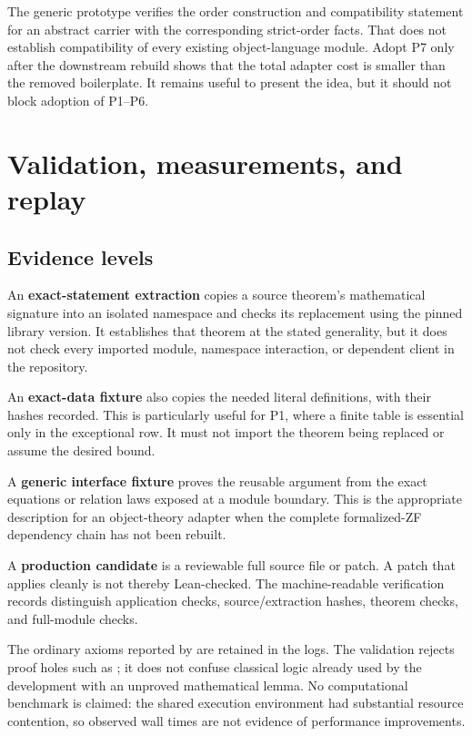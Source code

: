 \documentclass[11pt,letterpaper]{article}
\newcommand{\code}[1]{\texttt{\detokenize{#1}}}
\begin{document}
The generic prototype verifies the order construction and compatibility statement for an abstract carrier with the corresponding strict-order facts. That does not establish compatibility of every existing object-language module. Adopt P7 only after the downstream rebuild shows that the total adapter cost is smaller than the removed boilerplate. It remains useful to present the idea, but it should not block adoption of P1--P6.

\section{Validation, measurements, and replay}
\label{sec:validation}



\subsection{Evidence levels}

An \textbf{exact-statement extraction} copies a source theorem's mathematical signature into an isolated namespace and checks its replacement using the pinned library version. It establishes that theorem at the stated generality, but it does not check every imported module, namespace interaction, or dependent client in the repository.

An \textbf{exact-data fixture} also copies the needed literal definitions, with their hashes recorded. This is particularly useful for P1, where a finite table is essential only in the exceptional row. It must not import the theorem being replaced or assume the desired bound.

A \textbf{generic interface fixture} proves the reusable argument from the exact equations or relation laws exposed at a module boundary. This is the appropriate description for an object-theory adapter when the complete formalized-ZF dependency chain has not been rebuilt.

A \textbf{production candidate} is a reviewable full source file or patch. A patch that applies cleanly is not thereby Lean-checked. The machine-readable verification records distinguish application checks, source/extraction hashes, theorem checks, and full-module checks.

The ordinary axioms reported by \code{\#print axioms} are retained in the logs. The validation rejects proof holes such as \code{sorryAx}; it does not confuse classical logic already used by the development with an unproved mathematical lemma. No computational benchmark is claimed: the shared execution environment had substantial resource contention, so observed wall times are not evidence of performance improvements.
\end{document}
